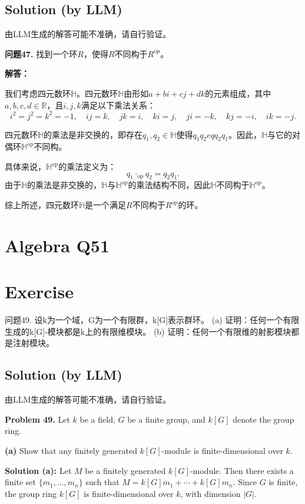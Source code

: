 \documentclass[12pt]{book}
\begin{document}
\subsection*{Solution (by LLM)}
由LLM生成的解答可能不准确，请自行验证。

\textbf{问题47.} 找到一个环$R$，使得$R$不同构于$R^{\text{op}}$。

\textbf{解答：}

我们考虑四元数环$\mathbb{H}$。四元数环$\mathbb{H}$由形如$a + bi + cj + dk$的元素组成，其中$a, b, c, d \in \mathbb{R}$，且$i, j, k$满足以下乘法关系：
\[
i^2 = j^2 = k^2 = -1, \quad ij = k, \quad jk = i, \quad ki = j, \quad ji = -k, \quad kj = -i, \quad ik = -j.
\]

四元数环$\mathbb{H}$的乘法是非交换的，即存在$q_1, q_2 \in \mathbb{H}$使得$q_1 q_2  eq q_2 q_1$。因此，$\mathbb{H}$与它的对偶环$\mathbb{H}^{\text{op}}$不同构。

具体来说，$\mathbb{H}^{\text{op}}$的乘法定义为：
\[
q_1 \cdot_{\text{op}} q_2 = q_2 q_1.
\]
由于$\mathbb{H}$的乘法是非交换的，$\mathbb{H}$与$\mathbb{H}^{\text{op}}$的乘法结构不同，因此$\mathbb{H}$不同构于$\mathbb{H}^{\text{op}}$。

综上所述，四元数环$\mathbb{H}$是一个满足$R$不同构于$R^{\text{op}}$的环。
\newpage
\section{Algebra Q51}
\section*{Exercise}
问题49. 设k为一个域，G为一个有限群，k[G]表示群环。
(a) 证明：任何一个有限生成的k[G]-模块都是k上的有限维模块。
(b) 证明：任何一个有限维的射影模块都是注射模块。





\subsection*{Solution (by LLM)}
由LLM生成的解答可能不准确，请自行验证。

\textbf{Problem 49.} Let $k$ be a field, $G$ be a finite group, and $k[G]$ denote the group ring.

\textbf{(a)} Show that any finitely generated $k[G]$-module is finite-dimensional over $k$.

\textbf{Solution (a):} Let $M$ be a finitely generated $k[G]$-module. Then there exists a finite set $\{m_1, \dots, m_n\}$ such that $M = k[G]m_1 + \cdots + k[G]m_n$. Since $G$ is finite, the group ring $k[G]$ is finite-dimensional over $k$, with dimension $|G|$. 
\end{document}
